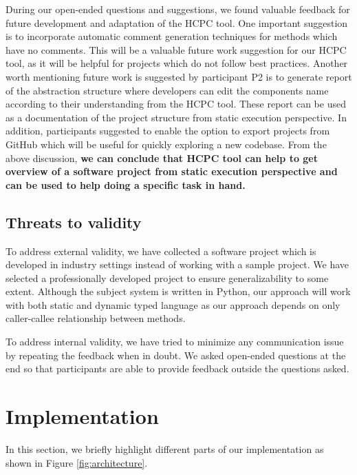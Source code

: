 During our open-ended questions and suggestions, we found valuable feedback for future development and adaptation of the HCPC tool. One important suggestion is to incorporate automatic comment generation techniques for methods which have no comments. This will be a valuable future work suggestion for our HCPC tool, as it will be helpful for projects which do not follow best practices. Another worth mentioning future work is suggested by participant P2 is to generate report of the abstraction structure where developers can edit the components name according to their understanding from the HCPC tool. These report can be used as a documentation of the project structure from static execution perspective. In addition, participants suggested to enable the option to export projects from GitHub which will be useful for quickly exploring a new codebase. From the above discussion, \textbf{we can conclude that HCPC tool can help to get overview of a software project from static execution perspective and can be used to help doing a specific task in hand.}




\subsection{Threats to validity}
To address external validity, we have collected a software project which is developed in industry settings instead of working with a sample project. We have selected a professionally developed project to ensure generalizability to some extent. Although the subject system is written in Python, our approach will work with both static and dynamic typed language as our approach depends on only caller-callee relationship between methods.

To address internal validity, we have tried to minimize any communication issue by repeating the feedback when in doubt. We asked open-ended questions at the end so that participants are able to provide feedback outside the questions asked. 


\section{Implementation }
\label{hla3:implementation}
In this section, we briefly highlight different parts of our implementation as shown in Figure \ref{fig:architecture}.

